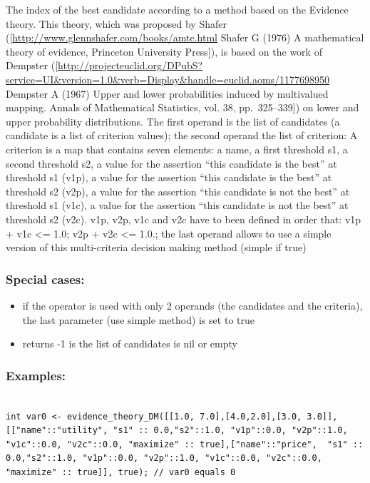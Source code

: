 \documentclass[]{book}
\providecommand{\tightlist}{%
  \setlength{\itemsep}{0pt}\setlength{\parskip}{0pt}}
\theoremstyle{definition}
\theoremstyle{definition}
\theoremstyle{definition}
\theoremstyle{remark}
\begin{document}
The index of the best candidate according to a method based on the
Evidence theory. This theory, which was proposed by Shafer
({[}\url{http://www.glennshafer.com/books/amte.html} Shafer G (1976) A
mathematical theory of evidence, Princeton University Press{]}), is
based on the work of Dempster
({[}\url{http://projecteuclid.org/DPubS?service=UI\&version=1.0\&verb=Display\&handle=euclid.aoms/1177698950}
Dempster A (1967) Upper and lower probabilities induced by multivalued
mapping. Annals of Mathematical Statistics, vol. 38, pp.~325--339{]}) on
lower and upper probability distributions. The first operand is the list
of candidates (a candidate is a list of criterion values); the second
operand the list of criterion: A criterion is a map that contains seven
elements: a name, a first threshold s1, a second threshold s2, a value
for the assertion ``this candidate is the best'' at threshold s1 (v1p),
a value for the assertion ``this candidate is the best'' at threshold s2
(v2p), a value for the assertion ``this candidate is not the best'' at
threshold s1 (v1c), a value for the assertion ``this candidate is not
the best'' at threshold s2 (v2c). v1p, v2p, v1c and v2c have to been
defined in order that: v1p + v1c \textless{}= 1.0; v2p + v2c
\textless{}= 1.0.; the last operand allows to use a simple version of
this multi-criteria decision making method (simple if true)

\subsubsection{Special cases:}\label{special-cases-57}

\begin{itemize}
\tightlist
\item
  if the operator is used with only 2 operands (the candidates and the
  criteria), the last parameter (use simple method) is set to true\\
\item
  returns -1 is the list of candidates is nil or empty
\end{itemize}

\subsubsection{Examples:}\label{examples-118}

\begin{verbatim}
 
int var0 <- evidence_theory_DM([[1.0, 7.0],[4.0,2.0],[3.0, 3.0]], [["name"::"utility", "s1" :: 0.0,"s2"::1.0, "v1p"::0.0, "v2p"::1.0, "v1c"::0.0, "v2c"::0.0, "maximize" :: true],["name"::"price",  "s1" :: 0.0,"s2"::1.0, "v1p"::0.0, "v2p"::1.0, "v1c"::0.0, "v2c"::0.0, "maximize" :: true]], true); // var0 equals 0
\end{verbatim}
\end{document}
